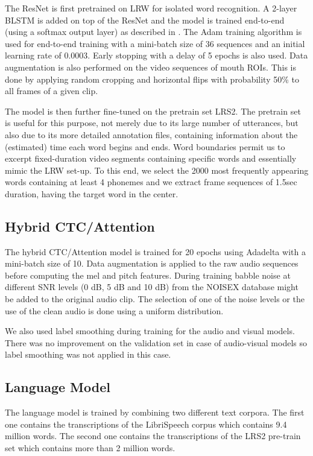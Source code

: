\documentclass{article}
\begin{document}
The ResNet is first pretrained on LRW for isolated word recognition.
A 2-layer BLSTM is added on top of the ResNet and the model is trained 
end-to-end (using a softmax output layer) as described in \cite{stafylakis2017combining}.
The Adam training algorithm \cite{kingma2014adam} is
used for end-to-end training with a mini-batch size of 36 sequences
and an initial learning rate of 0.0003. Early stopping
with a delay of 5 epochs is also used. Data augmentation
is also performed on the video sequences of mouth ROIs.
This is done by applying random cropping and horizontal
flips with probability 50\% to all frames of a given clip. 

The model is then further fine-tuned on the pretrain set LRS2. The pretrain set is useful for this purpose, not merely due to its large number of utterances, but also due to its more detailed annotation files, containing information about the (estimated) time each word begins and ends. Word boundaries permit us to excerpt fixed-duration video segments containing specific words and essentially mimic the LRW set-up. To this end, we select the 2000 most frequently appearing words containing at least 4 phonemes and we extract frame sequences of 1.5sec duration, having the target word in the center.

\subsection{Hybrid CTC/Attention}
The hybrid CTC/Attention model is trained for 20 epochs using Adadelta with  a mini-batch size of 10. Data augmentation is applied to the raw audio sequences before computing the mel and pitch features. During
training babble noise at different SNR levels (0 dB, 5 dB and 10
dB) from the NOISEX database \cite{varga1993assessment} might be added to the original audio clip. The selection
of one of the noise levels or the use of the clean audio is done
using a uniform distribution.

We also used label smoothing during training for the audio and visual models. There was no improvement on the validation set in case of audio-visual models so label smoothing was not applied in this case.

\subsection{Language Model}
The language model is trained by combining two different text corpora. The first one contains the transcriptions of the LibriSpeech corpus which contains 9.4 million words. The second one contains the transcriptions of the LRS2 pre-train set which contains more than 2 million words. 
\end{document}
